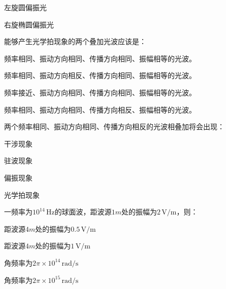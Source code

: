 \documentclass[standard, analysis, notocnum]{ExBook}
\newcommand{\answerarea}[1][8cm]{%
  \par\vspace{2mm}%
  \noindent{\color{themeColor!35}\rule{\linewidth}{0.4pt}}\par
  \noindent\begin{minipage}[t][#1][t]{\linewidth}\vspace{0pt}\end{minipage}\par
  \noindent{\color{themeColor!35}\rule{\linewidth}{0.4pt}}\par
}
\begin{document}
\begin{qitems}
\begin{bbox}
\par\noindent\hspace{2em}左旋圆偏振光
\par\noindent\hspace{2em}右旋椭圆偏振光
\answerarea[3.5cm]
\end{bbox}
\begin{bbox}
\qitem 能够产生光学拍现象的两个叠加光波应该是：
\par\noindent\hspace{2em}频率相同、振动方向相同、传播方向相同、振幅相等的光波。
\par\noindent\hspace{2em}频率相同、振动方向相反、传播方向相同、振幅相等的光波。
\par\noindent\hspace{2em}频率接近、振动方向相同、传播方向相同、振幅相等的光波。
\par\noindent\hspace{2em}频率相同、振动方向相同、传播方向相反、振幅相等的光波。
\answerarea[3.5cm]
\end{bbox}
\begin{bbox}
\qitem 两个频率相同、振动方向相同、传播方向相反的光波相叠加将会出现：
\par\noindent\hspace{2em}干涉现象
\par\noindent\hspace{2em}驻波现象
\par\noindent\hspace{2em}偏振现象
\par\noindent\hspace{2em}光学拍现象
\answerarea[3.5cm]
\end{bbox}
\begin{bbox}
\qitem 一频率为$10^{14}\,\mathrm{Hz}$的球面波，距波源$1m$处的振幅为$2\,\mathrm{V/m}$，则：
\par\noindent\hspace{2em}距波源$4m$处的振幅为$0.5\,\mathrm{V/m}$
\par\noindent\hspace{2em}距波源$4m$处的振幅为$1\,\mathrm{V/m}$
\par\noindent\hspace{2em}角频率为$2\pi \times 10^{14}\,\mathrm{rad/s}$
\par\noindent\hspace{2em}角频率为$2\pi \times 10^{15}\,\mathrm{rad/s}$

\end{bbox}
\end{qitems}
\end{document}
